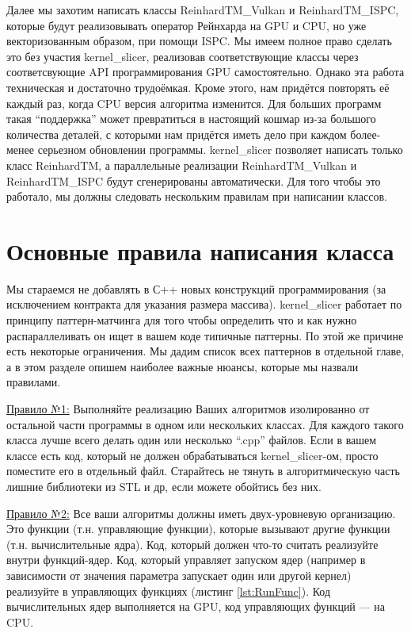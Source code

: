 \documentclass[11pt,fleqn,english,russian]{report} %
\begin{document}
Далее мы захотим написать классы ReinhardTM\_Vulkan и ReinhardTM\_ISPC, которые будут реализовывать оператор Рейнхарда на GPU и CPU, но уже векторизованным образом, при помощи ISPC. Мы имеем полное право сделать это без участия kernel\_slicer, реализовав соответствующие классы через соответсвующие API программирования GPU самостоятельно. Однако эта работа техническая и достаточно трудоёмкая. Кроме этого, нам придётся повторять её каждый раз, когда CPU версия алгоритма изменится. Для больших программ такая ``поддержка'' может превратиться в настоящий кошмар из-за большого количества деталей, с которыми нам придётся иметь дело при каждом более-менее серьезном обновлении программы. kernel\_slicer позволяет написать только класс ReinhardTM, а параллельные реализации ReinhardTM\_Vulkan и ReinhardTM\_ISPC будут сгенерированы автоматически. Для того чтобы это работало, мы должны следовать нескольким правилам при написании классов.

\section{Основные правила написания класса}

Мы стараемся не добавлять в С++ новых конструкций программирования (за исключением контракта для указания размера массива). kernel\_slicer работает по принципу паттерн-матчинга для того чтобы определить что и как нужно распараллеливать он ищет в вашем коде типичные паттерны. По этой же причине есть некоторые ограничения. Мы дадим список всех паттернов в отдельной главе, а в этом разделе опишем наиболее важные нюансы, которые мы назвали правилами.

\underline{Правило №1:} Выполняйте реализацию Ваших алгоритмов изолированно от остальной части программы в одном или нескольких классах. Для каждого такого класса лучше всего делать один или несколько ``.cpp'' файлов. Если в вашем классе есть код, который не должен обрабатываться kernel\_slicer-ом, просто поместите его в отдельный файл. Старайтесь не тянуть в алгоритмическую часть лишние библиотеки из STL и др, если можете обойтись без них.

\underline{Правило №2:} Все ваши алгоритмы должны иметь двух-уровневую организацию. Это функции (т.н. управляющие функции), которые вызывают другие функции (т.н. вычислительные ядра). Код, который должен что-то считать реализуйте внутри функций-ядер. Код, который управляет запуском ядер (например в зависимости от значения параметра запускает один или другой кернел) реализуйте в управляющих функциях (листинг \ref{lst:RunFunc}). Код вычислительных ядер выполняется на GPU, код управляющих функций --- на CPU.
\end{document}
